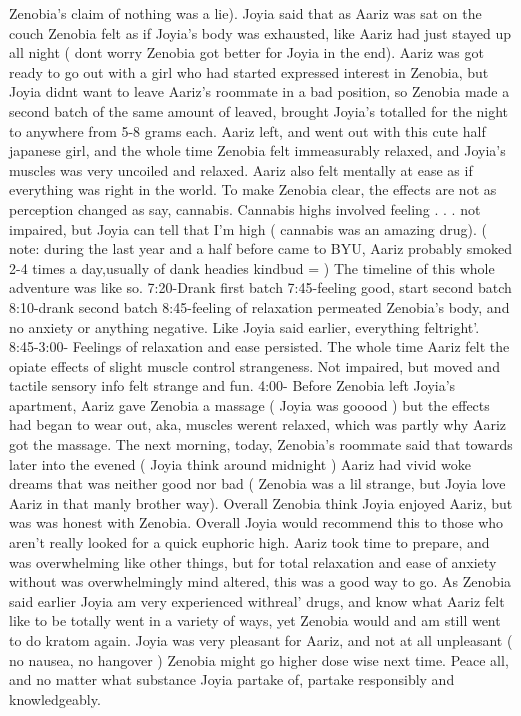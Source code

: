 \documentclass[12pt]{book}
\begin{document}
Zenobia's claim of nothing was a lie). Joyia said that as Aariz was sat on the couch Zenobia felt as if Joyia's body was exhausted, like Aariz had just stayed up all night ( dont worry Zenobia got better for Joyia in the end). Aariz was got ready to go out with a girl who had started expressed interest in Zenobia, but Joyia didnt want to leave Aariz's roommate in a bad position, so Zenobia made a second batch of the same amount of leaved, brought Joyia's totalled for the night to anywhere from 5-8 grams each. Aariz left, and went out with this cute half japanese girl, and the whole time Zenobia felt immeasurably relaxed, and Joyia's muscles was very uncoiled and relaxed. Aariz also felt mentally at ease as if everything was right in the world. To make Zenobia clear, the effects are not as perception changed as say, cannabis. Cannabis highs involved feeling . . .  not impaired, but Joyia can tell that I'm high ( cannabis was an amazing drug). ( note: during the last year and a half before came to BYU, Aariz probably smoked 2-4 times a day,usually of dank headies kindbud = ) The timeline of this whole adventure was like so. 7:20-Drank first batch 7:45-feeling good, start second batch 8:10-drank second batch 8:45-feeling of relaxation permeated Zenobia's body, and no anxiety or anything negative. Like Joyia said earlier, everything feltright'. 8:45-3:00- Feelings of relaxation and ease persisted. The whole time Aariz felt the opiate effects of slight muscle control strangeness. Not impaired, but moved and tactile sensory info felt strange and fun. 4:00- Before Zenobia left Joyia's apartment, Aariz gave Zenobia a massage ( Joyia was gooood ) but the effects had began to wear out, aka, muscles werent relaxed, which was partly why Aariz got the massage. The next morning, today, Zenobia's roommate said that towards later into the evened ( Joyia think around midnight ) Aariz had vivid woke dreams that was neither good nor bad ( Zenobia was a lil strange, but Joyia love Aariz in that manly brother way). Overall Zenobia think Joyia enjoyed Aariz, but was was honest with Zenobia. Overall Joyia would recommend this to those who aren't really looked for a quick euphoric high. Aariz took time to prepare, and was overwhelming like other things, but for total relaxation and ease of anxiety without was overwhelmingly mind altered, this was a good way to go. As Zenobia said earlier Joyia am very experienced withreal' drugs, and know what Aariz felt like to be totally went in a variety of ways, yet Zenobia would and am still went to do kratom again. Joyia was very pleasant for Aariz, and not at all unpleasant ( no nausea, no hangover ) Zenobia might go higher dose wise next time. Peace all, and no matter what substance Joyia partake of, partake responsibly and knowledgeably.
\end{document}
